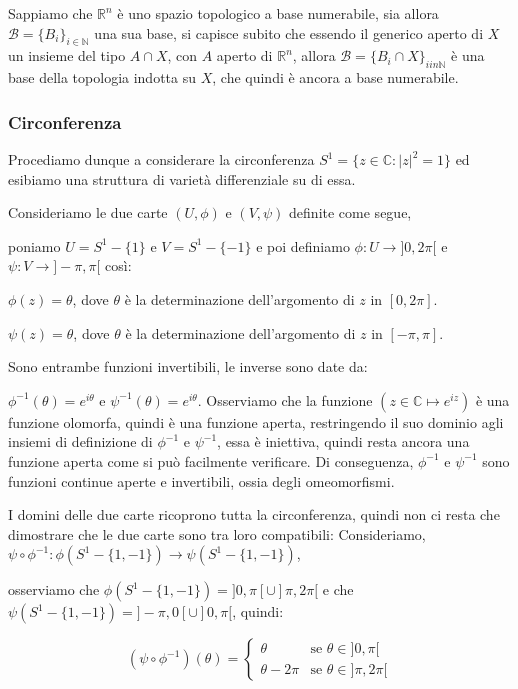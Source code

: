 \documentclass[12pt, a4paper]{article}
\theoremstyle{definition}
\begin{document}
Sappiamo che $\mathbb{R}^n$ è uno spazio topologico a base numerabile, sia allora $\mathcal{B} = \{ B_i \}_{i \in \mathbb{N}}$ una sua base, si capisce subito che essendo il generico aperto di $X$
un insieme del tipo $A \cap X$, con $A$ aperto di $\mathbb{R}^n$, allora $\mathcal{B} = \{ B_i \cap X \}_{i in \mathbb{N}}$  è una base della topologia indotta su $X$, che quindi è ancora
a base numerabile.

\subsubsection{Circonferenza}

Procediamo dunque a considerare la circonferenza $S^1 = \{ z \in \mathbb{C} : |z|^2 = 1 \}$ ed esibiamo una struttura di varietà differenziale su di essa.

Consideriamo le due carte $(U, \phi)$ e $(V, \psi)$ definite come segue,

poniamo $U = S^1 - \{1\}$ e $V = S^1 - \{-1\}$ e poi definiamo $\phi : U \to ]0, 2\pi[$ e $\psi : V \to ]-\pi, \pi[$ così:

$\phi(z) = \theta$, dove $\theta$ è la determinazione dell'argomento di $z$ in $[0, 2\pi]$.

$\psi(z) = \theta$, dove $\theta$ è la determinazione dell'argomento di $z$ in $[-\pi, \pi]$.

Sono entrambe funzioni invertibili, le inverse sono date da:

$\phi^{-1}(\theta) = e^{i\theta}$ e $\psi^{-1}(\theta) = e^{i\theta}$. Osserviamo che la funzione $(z \in \mathbb{C} \mapsto e^{iz})$ è una funzione olomorfa, quindi è una funzione aperta, restringendo
il suo dominio agli insiemi di definizione di $\phi^{-1}$ e $\psi^{-1}$, essa è iniettiva, quindi resta ancora una funzione aperta come si può facilmente verificare. Di conseguenza,
$\phi^{-1}$ e $\psi^{-1}$ sono funzioni continue aperte e invertibili, ossia degli omeomorfismi.

I domini delle due carte ricoprono tutta la circonferenza, quindi non ci resta che dimostrare che le due carte sono tra loro compatibili:
Consideriamo, $\psi \circ \phi^{-1} : \phi(S^1 - \{1, -1\}) \to \psi(S^1 - \{1, -1\})$,

osserviamo che $\phi(S^1 - \{1, -1\}) = ]0, \pi[ \cup ]\pi, 2\pi[$ e che $\psi(S^1 - \{1, -1\}) = ]-\pi, 0[ \cup ]0, \pi[$, quindi:

$$
(\psi \circ \phi^{-1})(\theta) = \begin{cases}
    \theta &\text{se $\theta \in ]0, \pi[$}\\
    \theta - 2\pi &\text{se $\theta \in ]\pi, 2\pi[$}
\end{cases}
$$
\end{document}
